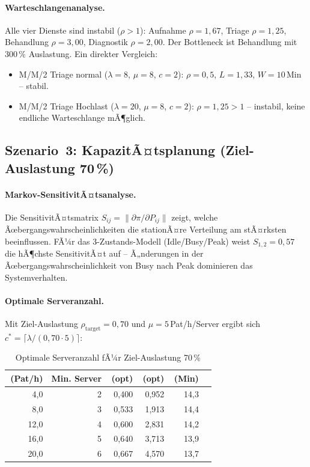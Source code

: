 ﻿\documentclass[a4paper,12pt]{report}
\theoremstyle{definition}
\begin{document}
\paragraph{Warteschlangenanalyse.}
Alle vier Dienste sind instabil ($\rho > 1$): Aufnahme $\rho = 1{,}67$,
Triage $\rho = 1{,}25$, Behandlung $\rho = 3{,}00$, Diagnostik $\rho = 2{,}00$.
Der Bottleneck ist Behandlung mit $300\,\%$ Auslastung. Ein direkter Vergleich:
\begin{itemize}
	\item[-] M/M/2 Triage normal ($\lambda=8$, $\mu=8$, $c=2$):
	$\rho = 0{,}5$, $L = 1{,}33$, $W = 10$\,Min -- stabil.
	\item[-] M/M/2 Triage Hochlast ($\lambda=20$, $\mu=8$, $c=2$):
	$\rho = 1{,}25 > 1$ -- instabil, keine endliche Warteschlange mÃ¶glich.
\end{itemize}

\subsection{Szenario~3: KapazitÃ¤tsplanung (Ziel-Auslastung 70\,\%)}

\paragraph{Markov-SensitivitÃ¤tsanalyse.}
Die SensitivitÃ¤tsmatrix $S_{ij} = \|\partial\pi / \partial P_{ij}\|$ zeigt,
welche Ãœbergangswahrscheinlichkeiten die stationÃ¤re Verteilung am stÃ¤rksten
beeinflussen. FÃ¼r das 3-Zustands-Modell (Idle/Busy/Peak) weist
$S_{1,2} = 0{,}57$ die hÃ¶chste SensitivitÃ¤t auf -- Ã„nderungen in der
Ãœbergangswahrscheinlichkeit von Busy nach Peak dominieren das Systemverhalten.

\paragraph{Optimale Serveranzahl.}
Mit Ziel-Auslastung $\rho_\text{target} = 0{,}70$ und $\mu = 5$\,Pat/h/Server
ergibt sich $c^* = \lceil \lambda / (0{,}70 \cdot 5) \rceil$:

\begin{table}[H]
	\centering
	\begin{tabular}{@{}rrrrrr@{}}
		\toprule
		\boldmath{$\lambda$}\,{\small(Pat/h)} & \textbf{Min. Server} & \boldmath{$\rho$}\,{\small(opt)} &
		\boldmath{$L$}\,{\small(opt)} & \boldmath{$W$}\,{\small(Min)} \\
		\midrule
		4{,}0 & 2 & 0{,}400 & 0{,}952 & 14{,}3 \\
		8{,}0 & 3 & 0{,}533 & 1{,}913 & 14{,}4 \\
		12{,}0 & 4 & 0{,}600 & 2{,}831 & 14{,}2 \\
		16{,}0 & 5 & 0{,}640 & 3{,}713 & 13{,}9 \\
		20{,}0 & 6 & 0{,}667 & 4{,}570 & 13{,}7 \\
		\bottomrule
	\end{tabular}
	\caption{Optimale Serveranzahl fÃ¼r Ziel-Auslastung 70\,\%}
\label{tab:optimale-server}
	\label{tab:capacity-planning}
\end{table}
\end{document}
